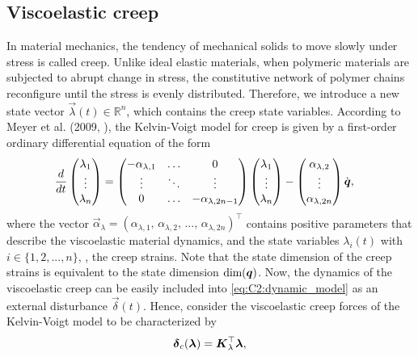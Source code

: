 \subsection{Viscoelastic creep}
\noindent In material mechanics, the tendency of mechanical solids to move slowly under stress is called creep. Unlike ideal elastic materials, when polymeric materials are subjected to abrupt change in stress, the constitutive network of polymer chains reconfigure until the stress is evenly distributed. Therefore, we introduce a new state vector $\vec{\lambda}(t)\in \mathbb{R}^n$, which contains the creep state variables. According to Meyer et al. (2009, \cite{Meyer2009}), the Kelvin-Voigt model for creep is given by a first-order ordinary differential equation of the form
%
\begin{align}
\frac{d}{dt}\begin{pmatrix} {\lambda}_1 \\ \vdots \\ {\lambda}_n \end{pmatrix} & = \begin{pmatrix} -\alpha_{\lambda,1} & \hdots & 0 \\
\vdots & \ddots & \vdots  \\ 0 & \hdots & -\alpha_{\lambda,2n-1} \end{pmatrix} \begin{pmatrix} \lambda_1 \\ \vdots \\ \lambda_n \end{pmatrix} -\begin{pmatrix} \alpha_{\lambda,2} \\ \vdots \\ \alpha_{\lambda,2n} \end{pmatrix} {\dot{\boldsymbol{q}}},
\label{eq:C2:creepmodel}
  \end{align}
%
\noindent where the vector $\vec{\alpha}_\lambda = (\alpha_{\lambda,1},\,\alpha_{\lambda,2},\,...,\,\alpha_{\lambda,2n})^\top$ contains positive parameters that describe the viscoelastic material dynamics, and the state variables $\lambda_i(t)$ with $i \in \{1,2,...,n\}$,  \ie, the creep strains. Note that the state dimension of the creep strains is equivalent to the state dimension $\text{dim}({\boldsymbol{q}})$. Now, the dynamics of the viscoelastic creep can be easily included into
\eqref{eq:C2:dynamic_model} as an external disturbance $\vec{\delta}(t)$. Hence, consider the viscoelastic creep forces of the Kelvin-Voigt model to be characterized by
%
\begin{equation}
\boldsymbol{\delta}_c({\boldsymbol{\lambda}}) = \boldsymbol{K}_{\lambda}^\top \boldsymbol{\lambda},
\label{eq:C2:creepcompliance}
\end{equation}
